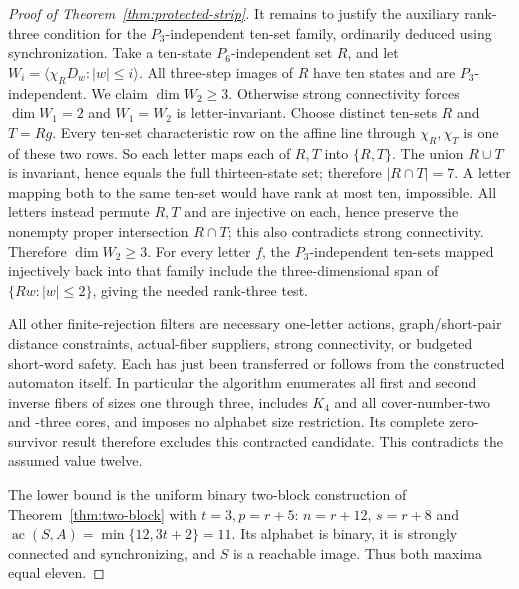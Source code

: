 \documentclass[10pt]{article}
\newcommand{\ac}{\operatorname{ac}}
\begin{document}
\begin{proof}[Proof of Theorem~\ref{thm:protected-strip}]
It remains to justify the auxiliary rank-three condition
for the $P_3$-independent ten-set family, ordinarily deduced
using synchronization. Take a ten-state $P_6$-independent
set $R$, and let $W_i=\langle\chi_RD_w:|w|\le i\rangle$.
All three-step images of $R$ have ten states and are
$P_3$-independent. We claim $\dim W_2\ge3$.
Otherwise strong connectivity forces $\dim W_1=2$ and
$W_1=W_2$ is letter-invariant. Choose distinct ten-sets
$R$ and $T=Rg$. Every ten-set characteristic row on the
affine line through $\chi_R,\chi_T$ is one of these two rows.
So each letter maps each of $R,T$ into $\{R,T\}$.
The union $R\cup T$ is invariant, hence equals the full
thirteen-state set; therefore $|R\cap T|=7$.
A letter mapping both to the same ten-set would have rank
at most ten, impossible. All letters instead permute
$R,T$ and are injective on each, hence preserve the
nonempty proper intersection $R\cap T$; this also
contradicts strong connectivity.
Therefore $\dim W_2\ge3$. For every letter $f$,
the $P_3$-independent ten-sets mapped injectively back into
that family include the three-dimensional span of
$\{Rw:|w|\le2\}$, giving the needed rank-three test.

All other finite-rejection filters are necessary one-letter
actions, graph/short-pair distance constraints, actual-fiber
suppliers, strong connectivity, or budgeted short-word
safety. Each has just been transferred or follows from
the constructed automaton itself. In particular the
algorithm enumerates all first and second inverse fibers
of sizes one through three, includes $K_4$ and all
cover-number-two and -three cores, and imposes no alphabet
size restriction. Its complete zero-survivor result
therefore excludes this contracted candidate. This
contradicts the assumed value twelve.

The lower bound is the uniform binary two-block construction
of Theorem~\ref{thm:two-block} with $t=3,p=r+5$:
$n=r+12$, $s=r+8$ and
$\ac(S,A)=\min\{12,3t+2\}=11$.
Its alphabet is binary, it is strongly connected and
synchronizing, and $S$ is a reachable image. Thus
both maxima equal eleven.
\end{proof}
\end{document}
